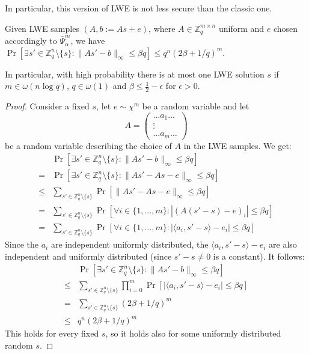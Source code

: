 \documentclass{report}
\newcommand{\Z}{\mathbb{Z}}
\begin{document}
In particular, this version of LWE is not less secure than the classic one.

\label{unique_lwe_solution}
Given LWE samples $(A, b:=As+e)$, where $A \in \Z_q^{m \times n}$ uniform and $e$ chosen accordingly to $\bar{\Psi}_\alpha^m$, we have $\Pr[\exists s' \in \Z_q^n \setminus \{s\}: \|As'-b\|_\infty \leq \beta q] \leq q^n(2\beta + 1/q)^m$.

In particular, with high probability there is at most one LWE solution $s$ if $m \in \omega(n\log q)$, $q \in \omega(1)$ and $\beta \leq \frac 1 2 - \epsilon$ for $\epsilon > 0$.

\begin{proof}
Consider a fixed $s$, let $e \sim \chi^m$ be a random variable and let
\begin{equation}
A = \begin{pmatrix}
	... a_1 ... \\
	\vdots \\
	... a_m ...
	\end{pmatrix}
\nonumber
\end{equation}
be a random variable describing the choice of $A$ in the LWE samples. We get:
\begin{equation}
\begin{split}
&\Pr[\exists s' \in \Z_q^n \setminus \{s\}: \| As' - b \|_\infty \leq \beta q] \\
= & \Pr[\exists s' \in \Z_q^n \setminus \{s\}: \| As' - As - e \|_\infty \leq \beta q] \\
\leq & \sum_{s' \in \Z_q^n \setminus \{s\}}\Pr[\|As' - As - e\|_\infty \leq \beta q] \\
= & \sum_{s' \in \Z_q^n \setminus \{s\}}\Pr[\forall i \in \{1, ..., m\}: |(A(s' - s) - e)_i| \leq \beta q] \\
= & \sum_{s' \in \Z_q^n \setminus \{s\}}\Pr[\forall i \in \{1, ..., m\}: |\langle a_i, s'-s \rangle - e_i| \leq \beta q]
\end{split} \nonumber
\end{equation}
Since the $a_i$ are independent uniformly distributed, the $\langle a_i, s'-s \rangle - e_i$ are also independent and uniformly distributed (since $s' - s \neq 0$ is a constant). It follows:
\begin{equation}
\begin{split}
&\Pr[\exists s' \in \Z_q^n \setminus \{s\}: \| As' - b \|_\infty \leq \beta q] \\
\leq & \sum_{s' \in \Z_q^n \setminus \{s\}} \prod_{i = 0}^m \Pr[|\langle a_i, s'-s \rangle - e_i| \leq \beta q] \\
= & \sum_{s' \in \Z_q^n \setminus \{s\}} (2 \beta + 1/q)^m \\
\leq & q^n(2\beta + 1/q)^m
\end{split} \nonumber
\end{equation}
This holds for every fixed $s$, so it holds also for some uniformly distributed random $s$.


\end{proof}
\end{document}
